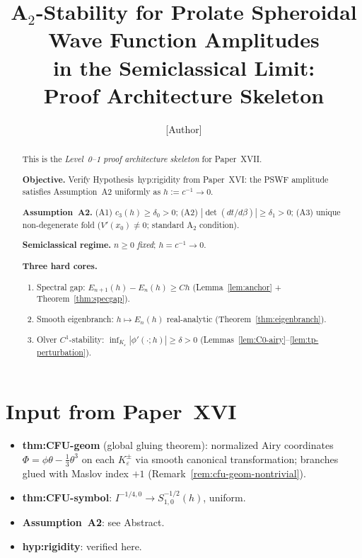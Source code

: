 \documentclass[12pt,a4paper]{amsart}
\theoremstyle{definition}
\theoremstyle{remark}
\begin{document}
\title[A$_2$-Stability for PSWF Amplitudes]{%
  A$_2$-Stability for Prolate Spheroidal Wave Function Amplitudes\\
  in the Semiclassical Limit:\\
  Proof Architecture Skeleton}

\author{[Author]}

\begin{abstract}
This is the \emph{Level~0--1 proof architecture skeleton} for Paper~XVII.

\medskip
\noindent\textbf{Objective.}
Verify Hypothesis~\textup{hyp:rigidity} from Paper~XVI:
the PSWF amplitude satisfies Assumption~A2 uniformly as $h:=c^{-1}\to 0$.

\medskip
\noindent\textbf{Assumption~A2.}
(A1) $c_3(h)\ge\delta_0>0$;
(A2) $|\det(dt/d\beta)|\ge\delta_1>0$;
(A3) unique non-degenerate fold ($V'(x_0)\ne 0$; standard A$_2$ condition).

\medskip
\noindent\textbf{Semiclassical regime.}
$n\ge 0$ \emph{fixed}; $h=c^{-1}\to 0$.

\medskip
\noindent\textbf{Three hard cores.}
\begin{enumerate}[\rm(C1)]
\item Spectral gap: $E_{n+1}(h)-E_n(h)\ge Ch$
  (Lemma~\ref{lem:anchor} + Theorem~\ref{thm:specgap}).
\item Smooth eigenbranch: $h\mapsto E_n(h)$ real-analytic
  (Theorem~\ref{thm:eigenbranch}).
\item Olver $C^1$-stability: $\inf_{K_\varepsilon}|\phi'(\cdot;h)|\ge\delta>0$
  (Lemmas~\ref{lem:C0-airy}--\ref{lem:tp-perturbation}).
\end{enumerate}
\end{abstract}

\maketitle
\tableofcontents

\section{Input from Paper~XVI}
\label{sec:input}

\begin{itemize}
\item \textbf{thm:CFU-geom} (global gluing theorem):
  normalized Airy coordinates $\Phi=\phi\theta-\tfrac13\theta^3$
  on each $K_\varepsilon^\pm$ via smooth canonical transformation;
  branches glued with Maslov index $+1$
  (Remark~\ref{rem:cfu-geom-nontrivial}).
\item \textbf{thm:CFU-symbol}: $I^{-1/4,0}\to S^{-1/2}_{1,0}(h)$, uniform.
\item \textbf{Assumption~A2}: see Abstract.
\item \textbf{hyp:rigidity}: verified here.
\end{itemize}
\end{document}
